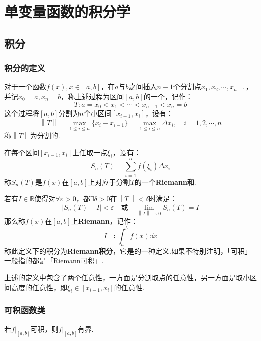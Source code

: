 \chapter{单变量函数的积分学}
\section{积分}
\subsection{积分的定义}
\begin{definition}
    对于一个函数$f(x),x\in[a,b]$，在$a$与$b$之间插入$n-1$个分割点$x_1,x_2,\cdots,x_{n-1}$，并记$x_0 = a,x_n = b$，称上述过程为区间$[a,b]$的一个，记作：
    \[T:a=x_0<x_1<\cdots<x_{n-1}<x_n=b\]
    这个过程将$[a,b]$分割为$n$个小区间$[x_{i-1},x_i]$，设有：
    \[\left\|T\right\| = \max_{1\leqslant i \leqslant n}\{x_i-x_{i-1}\} = \max_{1\leqslant i \leqslant n}\Delta x_i,\quad i=1,2,\cdots,n\]
    称$\left\|T\right\|$为分割的.

    在每个区间$[x_{i-1},x_i]$上任取一点$\xi_i$，设有：
    \[S_n(T) = \sum_{i=1}^{n} f(\xi_i)\Delta x_i\]
    称$S_n(T)$是$f(x)$在$[a,b]$上对应于分割$T$的一个\textbf{Riemann和}.
\end{definition}

\begin{definition}
    若有$I \in \mathbb{R}$使得对$\forall \varepsilon>0$，都$\exists \delta > 0$在$\left\|T\right\|<\delta$时满足：
    \[|S_n(T) - I| < \varepsilon \quad\text{或}\quad \lim\limits_{\left\|T\right\| \to 0} S_n(T) = I\]
    那么称$f(x)$在$[a,b]$上\textbf{Riemann}，记作：
    \[I \eqcolon \int_{a}^{b} f(x)\dd{x}\]
    称此定义下的积分为\textbf{Riemann积分}，它是的一种定义.如果不特别注明，「可积」一般指的都是「Riemann可积」.
\end{definition}
上述的定义中包含了两个任意性，一方面是分割取点的任意性，另一方面是取小区间高度的任意性，即$\xi_i \in [x_{i-1},x_i]$的任意性.


\subsection{可积函数类}
\begin{theorem}
    \label{thm:IntegrableImpliesBounded}
    若$\left.f\right|_{[a,b]}$可积，则$\left.f\right|_{[a,b]}$有界.
\end{theorem}


